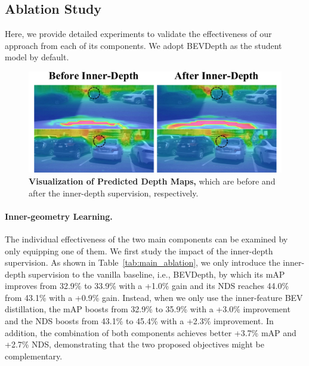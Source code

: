 %



%





\subsection{Ablation Study}
\label{sec:ablation}
Here, we provide detailed experiments to validate the effectiveness of our approach from each of its components. We adopt BEVDepth as the student model by default.

\begin{figure}[t]
    \centering
    \includegraphics[scale=0.4]{cvpr_2022/ref_vis.pdf}
    \caption{\textbf{Visualization of Predicted Depth Maps,} which are before and after the inner-depth supervision, respectively.}
    \label{fig:ref_compare}
\end{figure}

\paragraph{Inner-geometry Learning.} 
The individual effectiveness of the two main components can be examined by only equipping one of them. We first study the impact of the inner-depth supervision. As shown in Table~\ref{tab:main_ablation}, we only introduce the inner-depth supervision to the vanilla baseline, i.e., BEVDepth, by which its mAP improves from 32.9\% to 33.9\% with a +1.0\% gain and its NDS reaches 44.0\% from 43.1\% with a +0.9\% gain. 
Instead, when we only use the inner-feature BEV distillation, the mAP boosts from 32.9\% to 35.9\% with a +3.0\% improvement and the NDS boosts from 43.1\% to 45.4\% with a +2.3\% improvement. In addition, the combination of both components achieves better +3.7\% mAP and +2.7\% NDS, demonstrating that the two proposed objectives might be complementary.

